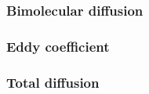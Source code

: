 \subsubsection{Bimolecular diffusion}


\subsubsection{Eddy coefficient}


\subsubsection{Total diffusion}

